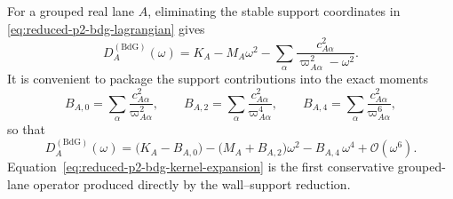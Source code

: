 \documentclass[11pt]{article}
\theoremstyle{definition}
\newcommand{\cO}{\mathcal O}
\begin{document}
For a grouped real lane $A$, eliminating the stable support coordinates in \eqref{eq:reduced-p2-bdg-lagrangian} gives
\begin{equation}
D_A^{(\mathrm{BdG})}(\omega)
=
K_A-M_A\omega^2-\sum_\alpha \frac{c_{A\alpha}^2}{\varpi_{A\alpha}^2-\omega^2}.
\label{eq:reduced-p2-bdg-kernel}
\end{equation}
It is convenient to package the support contributions into the exact moments
\begin{equation}
B_{A,0}=\sum_\alpha \frac{c_{A\alpha}^2}{\varpi_{A\alpha}^2},
\qquad
B_{A,2}=\sum_\alpha \frac{c_{A\alpha}^2}{\varpi_{A\alpha}^4},
\qquad
B_{A,4}=\sum_\alpha \frac{c_{A\alpha}^2}{\varpi_{A\alpha}^6},
\label{eq:reduced-bdg-moments}
\end{equation}
so that
\begin{equation}
D_A^{(\mathrm{BdG})}(\omega)
=
\bigl(K_A-B_{A,0}\bigr)
-
\bigl(M_A+B_{A,2}\bigr)\omega^2
-
B_{A,4}\,\omega^4
+
\cO(\omega^6).
\label{eq:reduced-p2-bdg-kernel-expansion}
\end{equation}
Equation~\eqref{eq:reduced-p2-bdg-kernel-expansion} is the first conservative grouped-lane operator produced directly by the wall--support reduction.
\end{document}
